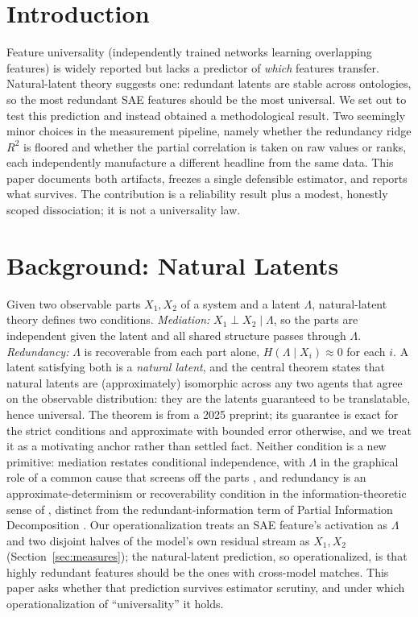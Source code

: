 \documentclass[11pt]{article}
\begin{document}
\section{Introduction}
Feature universality (independently trained networks learning overlapping features) is widely reported
\citep{olah2020zoom,towards2024universality,lan2024quantifying} but lacks a predictor of \emph{which}
features transfer. Natural-latent theory \citep{wentworth2025natural} suggests one: redundant latents are
stable across ontologies, so the most redundant SAE features should be the most universal.
We set out to test this prediction and instead obtained a methodological result. Two seemingly minor choices in the
measurement pipeline, namely whether the redundancy ridge $R^2$ is floored and whether the partial
correlation is taken on raw values or ranks, each independently manufacture a different headline from the same data.
This paper documents both artifacts, freezes a single defensible estimator, and reports what survives.
The contribution is a reliability result plus a modest, honestly scoped dissociation; it is not a
universality law.

\section{Background: Natural Latents}
\label{sec:background}
Given two observable parts $X_1, X_2$ of a system and a latent $\Lambda$, natural-latent theory
\citep{wentworth2025natural} defines two conditions. \emph{Mediation:} $X_1 \perp X_2 \mid \Lambda$, so
the parts are independent given the latent and all shared structure passes through $\Lambda$.
\emph{Redundancy:} $\Lambda$ is recoverable from each part alone, $H(\Lambda \mid X_i)\approx 0$ for each
$i$. A latent satisfying both is a \emph{natural latent}, and the central theorem states that natural
latents are (approximately) isomorphic across any two agents that agree on the observable distribution:
they are the latents guaranteed to be translatable, hence universal. The theorem is from a 2025 preprint;
its guarantee is exact for the strict conditions and approximate with bounded error otherwise, and we
treat it as a motivating anchor rather than settled fact. Neither condition is a new primitive: mediation
restates conditional independence, with $\Lambda$ in the graphical role of a common cause that screens
off the parts \citep{pearl2009causality}, and redundancy is an approximate-determinism or recoverability
condition in the information-theoretic sense of \citet{cover2006elements}, distinct from the
redundant-information term of Partial Information Decomposition \citep{williams2010nonnegative}. Our
operationalization treats an SAE feature's activation as $\Lambda$ and two disjoint halves of the model's
own residual stream as $X_1, X_2$ (Section~\ref{sec:measures}); the natural-latent prediction, so
operationalized, is that highly redundant features should be the ones with cross-model matches. This
paper asks whether that prediction survives estimator scrutiny, and under which operationalization of
``universality'' it holds.
\end{document}
